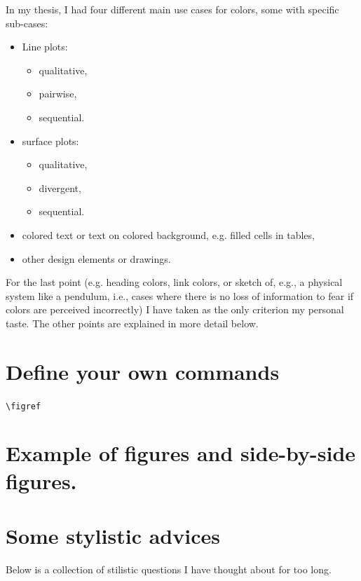 In my thesis, I had four different main use cases for colors, some with specific sub-cases:
\begin{itemize}
	\item Line plots:
		\begin{itemize}
			\item qualitative,
			\item pairwise,
			\item sequential. 
		\end{itemize}
	\item surface plots:
		\begin{itemize}
			\item qualitative,
			\item divergent,
			\item sequential. 
		\end{itemize}
	\item colored text or text on colored background, e.g. filled cells in tables,
	\item other design elements or drawings.
\end{itemize}
For the last point (e.g. heading colors, link colors, or sketch of, e.g., a physical system like a pendulum, i.e., cases where there is no loss of information to fear if colors are perceived incorrectly) I have taken as the only criterion my personal taste. The other points are explained in more detail below.


\section{Define your own commands}
\verb|\figref|

\section{Example of figures and side-by-side figures.}

\section{Some stylistic advices}
Below is a collection of stilistic questions I have thought about for too long.
